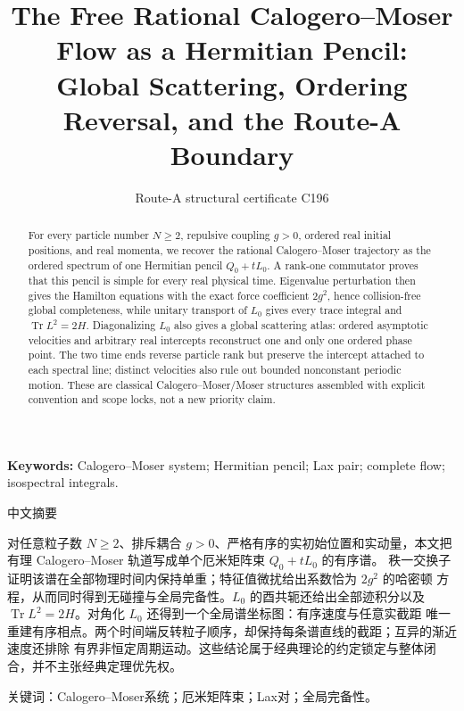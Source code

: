 \documentclass[9pt]{extarticle}
\title{The Free Rational Calogero--Moser Flow as a Hermitian Pencil:\\
Global Scattering, Ordering Reversal, and the Route-A Boundary}
\author{Route-A structural certificate C196}
\date{}
\begin{document}
\maketitle
\begin{abstract}
For every particle number $N\ge2$, repulsive coupling $g>0$, ordered real
initial positions, and real momenta, we recover the rational
Calogero--Moser trajectory as the ordered spectrum of one Hermitian pencil
$Q_0+tL_0$.  A rank-one commutator proves that this pencil is simple for
every real physical time.  Eigenvalue perturbation then gives the Hamilton
equations with the exact force coefficient $2g^2$, hence collision-free
global completeness, while unitary transport of $L_0$ gives every trace
integral and $\operatorname{Tr}L^2=2H$.  Diagonalizing $L_0$ also gives a
global scattering atlas: ordered asymptotic velocities and arbitrary real
intercepts reconstruct one and only one ordered phase point.  The two time
ends reverse particle rank but preserve the intercept attached to each
spectral line; distinct velocities also rule out bounded nonconstant periodic
motion.  These are classical Calogero--Moser/Moser structures assembled with
explicit convention and scope locks, not a new priority claim.
\end{abstract}
\noindent\textbf{Keywords:} Calogero--Moser system; Hermitian pencil; Lax
pair; complete flow; isospectral integrals.

\begin{otherlanguage}{chinese-simplified}
\begin{center}{\large 中文摘要}\end{center}
对任意粒子数 $N\ge2$、排斥耦合 $g>0$、严格有序的实初始位置和实动量，本文把有理
\foreignlanguage{english}{Calogero--Moser} 轨道写成单个厄米矩阵束 $Q_0+tL_0$ 的有序谱。
秩一交换子证明该谱在全部物理时间内保持单重；特征值微扰给出系数恰为 $2g^2$ 的哈密顿
方程，从而同时得到无碰撞与全局完备性。$L_0$ 的酉共轭还给出全部迹积分以及
$\operatorname{Tr}L^2=2H$。对角化 $L_0$ 还得到一个全局谱坐标图：有序速度与任意实截距
唯一重建有序相点。两个时间端反转粒子顺序，却保持每条谱直线的截距；互异的渐近速度还排除
有界非恒定周期运动。这些结论属于经典理论的约定锁定与整体闭合，并不主张经典定理优先权。

\noindent 关键词：\foreignlanguage{english}{Calogero--Moser}系统；厄米矩阵束；\foreignlanguage{english}{Lax}对；全局完备性。
\end{otherlanguage}
\end{document}

